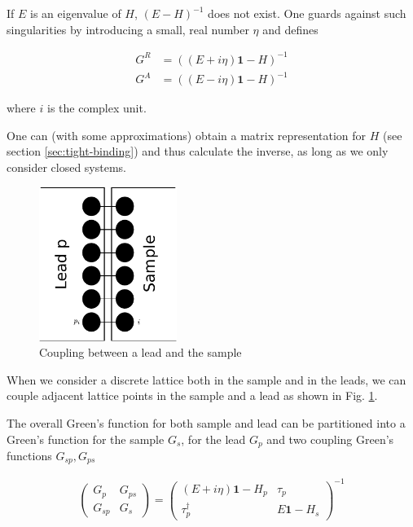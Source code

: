 \documentclass[11pt]{report}
\begin{document}
If $E$ is an eigenvalue of $H$, $(E-H)^{-1}$ does not exist. One guards
against such singularities by introducing a small, real number $\eta$ and
defines

\begin{align}
    G^R &= \left( (E + i \eta)\mathbf{1} - H \right)^{-1}\\
    G^A &= \left( (E - i \eta)\mathbf{1} - H \right)^{-1}
\end{align}

where $i$ is the complex unit.

One can (with some approximations) obtain a matrix representation for $H$
(see section \ref{sec:tight-binding}) and thus calculate the inverse, as
long as we only consider closed systems.

\begin{figure}
    \begin{center}
        \includegraphics[height=5cm]{coupling-sample-lead}
    \end{center}
    \caption{Coupling between a lead and the sample}
    \label{fig:coupling-sample-lead}
\end{figure}

When we consider a discrete lattice both in the sample and in the leads, we
can couple adjacent lattice points in the sample and a lead as shown in Fig.
\ref{fig:coupling-sample-lead}.

The overall Green's function for both sample and lead can be partitioned into
a Green's function for the sample $G_s$, for the lead $G_p$ and two coupling
Green's functions $G_{sp}, G_{ps}$

\begin{align}
\left(
    \begin{array}{ll}
        G_p    & G_{ps}\\
        G_{sp} & G_s
    \end{array}
\right)
=
\left(
    \begin{array}{ll}
        (E + i\eta)\mathbf{1} - H_p   & \tau_p\\
        \tau_p^\dagger                & E\mathbf{1} - H_s
    \end{array}
\right)^{-1}
\label{eq:coupling-green}
\end{align}
\end{document}
